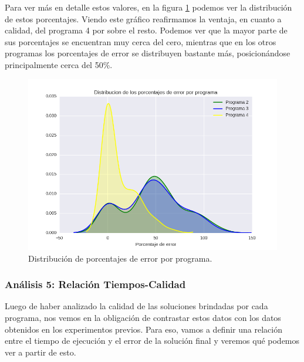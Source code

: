\par Para ver más en detalle estos valores, en la figura \ref{fig: ej5_calidad_distr_porc} podemos ver la distribución de estos porcentajes. Viendo este gráfico reafirmamos la ventaja, en cuanto a calidad, del programa 4 por sobre el resto. Podemos ver que la mayor parte de sus porcentajes se encuentran muy cerca del cero, mientras que en los otros programas los porcentajes de error se distribuyen bastante más, posicionándose principalmente cerca del 50\%.

\begin{figure}[H]
  \begin{center}
    \includegraphics[width=\textwidth]{img/ejercicio5/calidad_distribuciones_error.png}
    \caption{Distribución de porcentajes de error por programa.}
    \label{fig: ej5_calidad_distr_porc}
  \end{center}
\end{figure}

\subsubsection{Análisis 5: Relación Tiempos-Calidad}

\par Luego de haber analizado la calidad de las soluciones brindadas por cada programa, nos vemos en la obligación de contrastar estos datos con los datos obtenidos en los experimentos previos. Para eso, vamos a definir una relación entre el tiempo de ejecución y el error de la solución final y veremos qué podemos ver a partir de esto.

